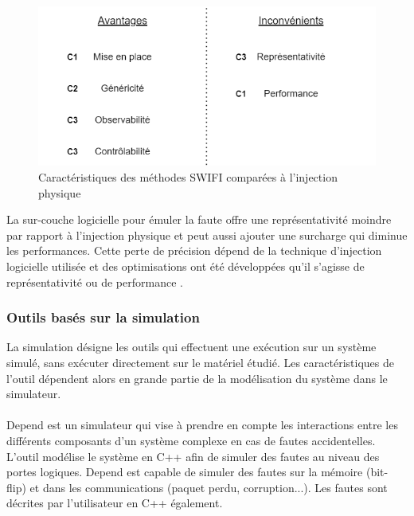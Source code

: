                 \begin{figure}[htpb]\centering
                  \includegraphics[scale=.41]{ch2-background/img/advantages-swifi.drawio.png}
                  \caption{Caractéristiques des méthodes SWIFI comparées à l'injection physique}
                  \label{fig:soa-tools-scheme-swifi}
                \end{figure}
                
                La sur-couche logicielle pour émuler la faute offre une représentativité moindre par rapport à l'injection physique et peut aussi ajouter une surcharge qui diminue les performances. Cette perte de précision dépend de la technique d'injection logicielle utilisée et des optimisations ont été développées qu'il s'agisse de représentativité ou de performance \cite{Lu/SQRS15, Georgakoudis/ICHPCNSA17}.
    
            \subsubsection{Outils basés sur la simulation}
            \label{sec:soa-tools-simu}
            
                La simulation désigne les outils qui effectuent une exécution sur un système simulé, sans exécuter directement sur le matériel étudié. 
                Les caractéristiques de l'outil dépendent alors en grande partie de la modélisation du système dans le simulateur.
                
                \paragraph{} 
                Depend \cite{Goswami/TC97} est un simulateur qui vise à prendre en compte les interactions entre les différents composants d'un système complexe en cas de fautes accidentelles.
                L'outil modélise le système en C++ afin de simuler des fautes au niveau des portes logiques. 
                Depend est capable de simuler des fautes sur la mémoire (bit-flip) et dans les communications (paquet perdu, corruption...). Les fautes sont décrites par l'utilisateur en C++ également.
                
